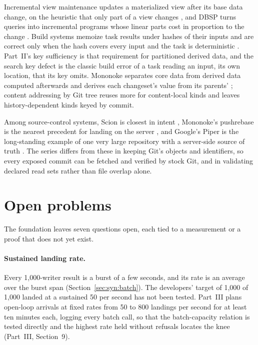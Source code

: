 \documentclass[11pt,letterpaper]{article}
\theoremstyle{definition}
\theoremstyle{remark}
\begin{document}
Incremental view maintenance updates a materialized view after its base data change, on the heuristic that only part of a view changes \cite{gupta1995maintenance}, and DBSP turns queries into incremental programs whose linear parts cost in proportion to the change \cite{budiu2023dbsp}. Build systems memoize task results under hashes of their inputs and are correct only when the hash covers every input and the task is deterministic \cite{mokhov2018build}. Part~II's key sufficiency is that requirement for partitioned derived data, and the search key defect is the classic build error of a task reading an input, its own location, that its key omits. Mononoke separates core data from derived data computed afterwards and derives each changeset's value from its parents' \cite{mononokederived}; content addressing by Git tree reuses more for content-local kinds and leaves history-dependent kinds keyed by commit.

Among source-control systems, Scion is closest in intent \cite{anthropic2026scion}, Mononoke's pushrebase is the nearest precedent for landing on the server \cite{mononokepushrebase}, and Google's Piper is the long-standing example of one very large repository with a server-side source of truth \cite{potvin2016piper}. The series differs from these in keeping Git's objects and identifiers, so every exposed commit can be fetched and verified by stock Git, and in validating declared read sets rather than file overlap alone.

\section{Open problems}
\label{sec:syn:open}

The foundation leaves seven questions open, each tied to a measurement or a proof that does not yet exist.

\paragraph{Sustained landing rate.} Every 1,000-writer result is a burst of a few seconds, and its rate is an average over the burst span (Section~\ref{sec:syn:batch}). The developers' target of 1,000 of 1,000 landed at a sustained 50 per second has not been tested. %
Part~III plans open-loop arrivals at fixed rates from 50 to 800 landings per second for at least ten minutes each, %
 logging every batch call, so that the batch-capacity relation is tested directly and the highest rate held without refusals locates the knee (Part~III, Section~9).
\end{document}
